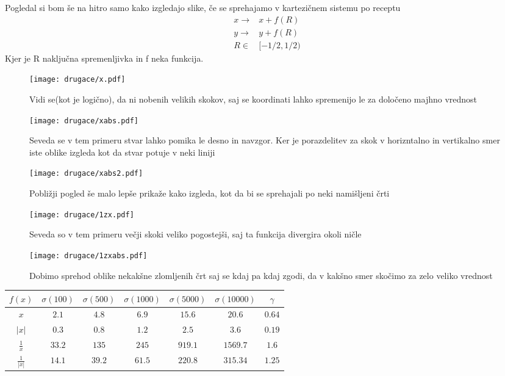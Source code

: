 \documentclass{article}
\begin{document}
Pogledal si bom še na hitro samo kako izgledajo slike, če se sprehajamo v kartezičnem sistemu po receptu
\begin{align*}
x \rightarrow&  x + f(R) \\
y \rightarrow&  y + f(R) \\  R \in& [-1/2,1/2) 
\end{align*}
Kjer je R naključna spremenljivka in f neka funkcija.

\begin{figure}[H]
\texttt{[image: drugace/x.pdf]}
\caption*{Vidi se(kot je logično), da ni nobenih velikih skokov, saj se koordinati lahko spremenijo le za določeno majhno vrednost}
\end{figure}

\begin{figure}[H]
\texttt{[image: drugace/xabs.pdf]}
\caption*{Seveda se v tem primeru stvar lahko pomika le desno in navzgor. Ker je porazdelitev za skok v horizntalno in vertikalno smer iste oblike izgleda kot da stvar potuje v neki liniji}
\end{figure}

\begin{figure}[H]
\texttt{[image: drugace/xabs2.pdf]}
\caption*{Pobližji pogled še malo lepše prikaže kako izgleda, kot da bi se sprehajali po neki namišljeni črti}
\end{figure}

\begin{figure}[H]
\texttt{[image: drugace/1zx.pdf]}
\caption*{Seveda so v tem primeru večji skoki veliko pogostejši, saj ta funkcija divergira okoli ničle}
\end{figure}

\begin{figure}[H]
\texttt{[image: drugace/1zxabs.pdf]}
\caption*{Dobimo sprehod oblike nekakšne zlomljenih črt saj se kdaj pa kdaj zgodi, da v kakšno smer skočimo za zelo veliko vrednost}
\end{figure}

\begin{center}
\begin{tabular}{| c | c | c | c | c | c | c |}
\hline
$f(x)$ & $\sigma(100)$ & $\sigma(500)$ & $\sigma(1000)$ & $\sigma(5000)$ & $\sigma(10000)$ & $\gamma$ \\
\hline
\hline
$x$ & $2.1$ & $4.8$ & $6.9$ & $15.6$ & $20.6$ & $0.64$ \\
$|x|$ & $0.3$ & $0.8$ & $1.2$ & $2.5$ & $3.6$ & $0.19$ \\
$\frac{1}{x}$ & $33.2$ & $135$ & $245$ & $919.1$ & $1569.7$ & $1.6$ \\
$\frac{1}{|x|}$ & $14.1$ & $39.2$ & $61.5$ & $220.8$ & $315.34$ & $1.25$ \\
\hline
\end{tabular}
\end{center}
\end{document}
